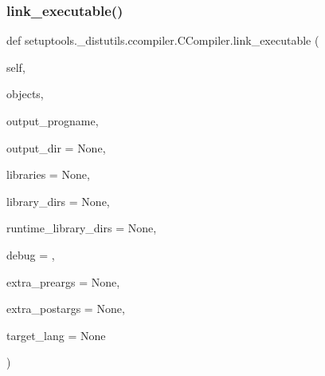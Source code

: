 \subsubsection{\texorpdfstring{link\+\_\+executable()}{link\_executable()}}
{\footnotesize\ttfamily def setuptools.\+\_\+distutils.\+ccompiler.\+C\+Compiler.\+link\+\_\+executable (\begin{DoxyParamCaption}\item[{}]{self,  }\item[{}]{objects,  }\item[{}]{output\+\_\+progname,  }\item[{}]{output\+\_\+dir = {\ttfamily None},  }\item[{}]{libraries = {\ttfamily None},  }\item[{}]{library\+\_\+dirs = {\ttfamily None},  }\item[{}]{runtime\+\_\+library\+\_\+dirs = {\ttfamily None},  }\item[{}]{debug = {},  }\item[{}]{extra\+\_\+preargs = {\ttfamily None},  }\item[{}]{extra\+\_\+postargs = {\ttfamily None},  }\item[{}]{target\+\_\+lang = {\ttfamily None} }\end{DoxyParamCaption})}

\mbox{\label{classsetuptools_1_1__distutils_1_1ccompiler_1_1CCompiler_a1742fc7eb8715f75f4ed813a6c1c704c}} 
